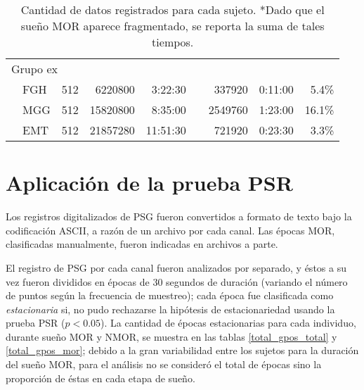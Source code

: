\begin{table}
{\begin{tabular}{llcrrcrrr}
\multicolumn{6}{l}{{Grupo ex}}\\
&FGH &512       &6220800 &   3:22:30 &&337920  &   0:11:00 & 5.4\% \\
&MGG &512       &15820800&   8:35:00 &&2549760 &   1:23:00 &16.1\% \\
&EMT &512       &21857280&  11:51:30 &&721920  &   0:23:30 & 3.3\% \\
\bottomrule
\end{tabular}
}
\caption{Cantidad de datos registrados para cada sujeto. *Dado que el sueño MOR aparece fragmentado,
se reporta la suma de tales tiempos.}
\label{frecuencias}
\end{table}


\section{Aplicación de la prueba PSR}

Los registros digitalizados de PSG fueron convertidos a formato de texto bajo la codificación 
ASCII, a razón de un archivo por cada canal. 
Las épocas MOR, clasificadas manualmente, fueron indicadas en archivos a parte.



El registro de PSG por cada canal fueron analizados por separado, y éstos a su vez fueron divididos
en épocas de 30 segundos de duración (variando el número de puntos según la frecuencia de muestreo);
cada época fue clasificada como \textit{estacionaria} si, no pudo rechazarse la hipótesis de 
estacionariedad usando la prueba PSR ($p < 0.05$).
La cantidad de épocas estacionarias para cada individuo, durante sueño MOR y NMOR, se muestra en 
las tablas \ref{total_gpos_total} y \ref{total_gpos_mor}; debido a la gran variabilidad entre los 
sujetos para la duración del sueño MOR, para el análisis no se consideró el total de épocas sino la 
proporción de éstas en cada etapa de sueño. 


